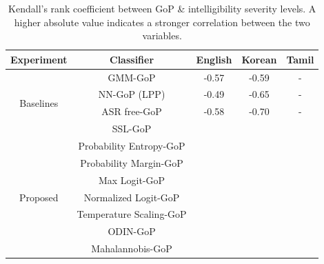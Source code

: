 \begin{table}[t]
\caption{
Kendall's rank coefficient between GoP \& intelligibility severity levels. A higher absolute value indicates a stronger correlation between the two variables.
}
\label{tab:results}
\centering
\resizebox{0.45\textwidth}{!}
{
\begin{tabular}{c|c|c|c|c}
\hline
Experiment & Classifier & English & Korean & Tamil \\
\hline
\multirow{4}{*}{Baselines} 
& GMM-GoP \cite{witt2000phone,hmm-gop} & -0.57 & -0.59 & - \\
& NN-GoP (LPP) \cite{hu2015improved} & -0.49 & -0.65 & -  \\
& ASR free-GoP \cite{Cheng2020ASRFreePA} & -0.58 & -0.70 & - \\
& SSL-GoP \cite{xu2021explore} & &  &\\
\hline
\multirow{7}{*}{Proposed} 
& Probability Entropy-GoP & &  &   \\
& Probability Margin-GoP & & &  \\
& Max Logit-GoP & & &   \\
\cline{2-5}
& Normalized Logit-GoP & &  &  \\
& Temperature Scaling-GoP & &  &  \\
& ODIN-GoP & &  &  \\
& Mahalannobis-GoP & & &   \\
\hline
\end{tabular}
}
\vspace{-1em}
\end{table}

%
